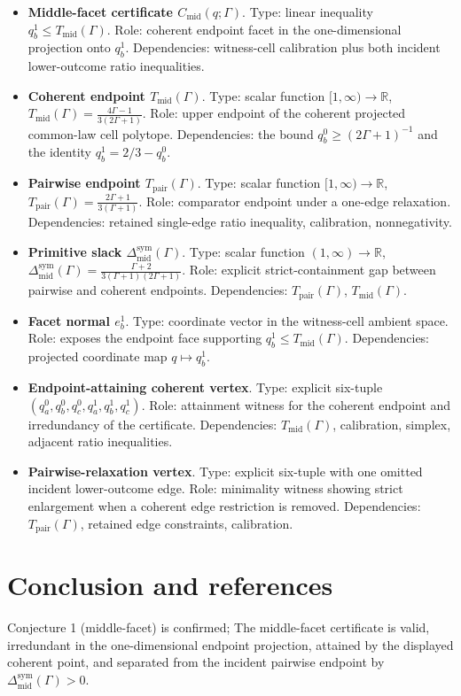 \documentclass[11pt]{article}
\theoremstyle{definition}
\theoremstyle{plain}
\theoremstyle{remark}
\begin{document}
\begin{itemize}[leftmargin=2em]
  \item \textbf{Middle-facet certificate \(C_{\mathrm{mid}}(q;\Gamma)\)}.  Type: linear inequality \(q_b^1\le T_{\mathrm{mid}}(\Gamma)\).  Role: coherent endpoint facet in the one-dimensional projection onto \(q_b^1\).  Dependencies: witness-cell calibration plus both incident lower-outcome ratio inequalities.
  \item \textbf{Coherent endpoint \(T_{\mathrm{mid}}(\Gamma)\)}.  Type: scalar function \([1,\infty)\to\mathbb R\), \(T_{\mathrm{mid}}(\Gamma)=\frac{4\Gamma-1}{3(2\Gamma+1)}\).  Role: upper endpoint of the coherent projected common-law cell polytope.  Dependencies: the bound \(q_b^0\ge(2\Gamma+1)^{-1}\) and the identity \(q_b^1=2/3-q_b^0\).
  \item \textbf{Pairwise endpoint \(T_{\mathrm{pair}}(\Gamma)\)}.  Type: scalar function \([1,\infty)\to\mathbb R\), \(T_{\mathrm{pair}}(\Gamma)=\frac{2\Gamma+1}{3(\Gamma+1)}\).  Role: comparator endpoint under a one-edge relaxation.  Dependencies: retained single-edge ratio inequality, calibration, nonnegativity.
  \item \textbf{Primitive slack \(\Delta_{\mathrm{mid}}^{\mathrm{sym}}(\Gamma)\)}.  Type: scalar function \((1,\infty)\to\mathbb R\), \(\Delta_{\mathrm{mid}}^{\mathrm{sym}}(\Gamma)=\frac{\Gamma+2}{3(\Gamma+1)(2\Gamma+1)}\).  Role: explicit strict-containment gap between pairwise and coherent endpoints.  Dependencies: \(T_{\mathrm{pair}}(\Gamma)\), \(T_{\mathrm{mid}}(\Gamma)\).
  \item \textbf{Facet normal \(e_b^1\)}.  Type: coordinate vector in the witness-cell ambient space.  Role: exposes the endpoint face supporting \(q_b^1\le T_{\mathrm{mid}}(\Gamma)\).  Dependencies: projected coordinate map \(q\mapsto q_b^1\).
  \item \textbf{Endpoint-attaining coherent vertex}.  Type: explicit six-tuple \((q_a^0,q_b^0,q_c^0,q_a^1,q_b^1,q_c^1)\).  Role: attainment witness for the coherent endpoint and irredundancy of the certificate.  Dependencies: \(T_{\mathrm{mid}}(\Gamma)\), calibration, simplex, adjacent ratio inequalities.
  \item \textbf{Pairwise-relaxation vertex}.  Type: explicit six-tuple with one omitted incident lower-outcome edge.  Role: minimality witness showing strict enlargement when a coherent edge restriction is removed.  Dependencies: \(T_{\mathrm{pair}}(\Gamma)\), retained edge constraints, calibration.
\end{itemize}

\section{Conclusion and references}
Conjecture 1 (middle-facet) is confirmed; The middle-facet certificate is valid, irredundant in the one-dimensional endpoint projection, attained by the displayed coherent point, and separated from the incident pairwise endpoint by \(\Delta_{\mathrm{mid}}^{\mathrm{sym}}(\Gamma)>0\).
\end{document}
